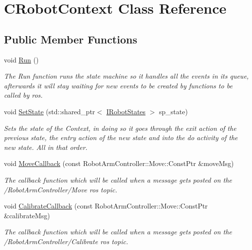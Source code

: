 \hypertarget{classCRobotContext}{}\section{C\+Robot\+Context Class Reference}
\label{classCRobotContext}
\subsection*{Public Member Functions}
\begin{DoxyCompactItemize}
\item 
void \hyperlink{classCRobotContext_af50652269de0b3977920d97345ac3606}{Run} ()
\begin{DoxyCompactList}\small\item\em The Run function runs the state machine so it handles all the events in its queue, afterwards it will stay waiting for new events to be created by functions to be called by ros. \end{DoxyCompactList}\item 
void \hyperlink{classCRobotContext_a34c126d70c235c1fdd60d028aea523d7}{Set\+State} (std\+::shared\+\_\+ptr$<$ \hyperlink{classIRobotStates}{I\+Robot\+States} $>$ sp\+\_\+state)
\begin{DoxyCompactList}\small\item\em Sets the state of the Context, in doing so it goes through the exit action of the previous state, the entry action of the new state and into the do activity of the new state. All in that order. \end{DoxyCompactList}\item 
void \hyperlink{classCRobotContext_a0c691e094641e2e424dce4505a5db275}{Move\+Callback} (const Robot\+Arm\+Controller\+::\+Move\+::\+Const\+Ptr \&move\+Msg)
\begin{DoxyCompactList}\small\item\em The callback function which will be called when a message gets posted on the /\+Robot\+Arm\+Controller/\+Move ros topic. \end{DoxyCompactList}\item 
void \hyperlink{classCRobotContext_a64c5bcd86ffe2d1dff1354187f8e165b}{Calibrate\+Callback} (const Robot\+Arm\+Controller\+::\+Move\+::\+Const\+Ptr \&calibrate\+Msg)
\begin{DoxyCompactList}\small\item\em The callback function which will be called when a message gets posted on the /\+Robot\+Arm\+Controller/\+Calibrate ros topic. \end{DoxyCompactList}\item 

\end{DoxyCompactItemize}
